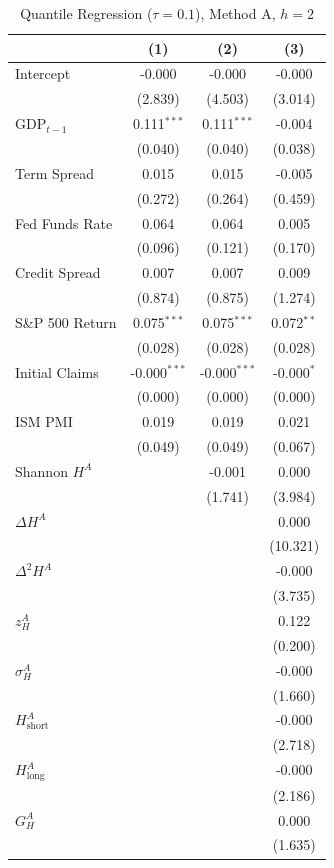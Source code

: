 \begin{table}[htbp]
\centering
\caption{Quantile Regression ($\tau = 0.1$), Method A, $h = 2$}
\label{tab:qr_coef_A_h2}
\footnotesize
\begin{tabular}{lccc}
\toprule
 & (1) & (2) & (3) \\
\midrule
  Intercept & -0.000 & -0.000 & -0.000 \\
  & (2.839) & (4.503) & (3.014) \\[2pt]
  GDP$_{t-1}$ & 0.111$^{***}$ & 0.111$^{***}$ & -0.004 \\
  & (0.040) & (0.040) & (0.038) \\[2pt]
  Term Spread & 0.015 & 0.015 & -0.005 \\
  & (0.272) & (0.264) & (0.459) \\[2pt]
  Fed Funds Rate & 0.064 & 0.064 & 0.005 \\
  & (0.096) & (0.121) & (0.170) \\[2pt]
  Credit Spread & 0.007 & 0.007 & 0.009 \\
  & (0.874) & (0.875) & (1.274) \\[2pt]
  S\&P 500 Return & 0.075$^{***}$ & 0.075$^{***}$ & 0.072$^{**}$ \\
  & (0.028) & (0.028) & (0.028) \\[2pt]
  Initial Claims & -0.000$^{***}$ & -0.000$^{***}$ & -0.000$^{*}$ \\
  & (0.000) & (0.000) & (0.000) \\[2pt]
  ISM PMI & 0.019 & 0.019 & 0.021 \\
  & (0.049) & (0.049) & (0.067) \\[2pt]
  Shannon $H^A$ &  & -0.001 & 0.000 \\
  &  & (1.741) & (3.984) \\[2pt]
  $\Delta H^A$ &  &  & 0.000 \\
  &  &  & (10.321) \\[2pt]
  $\Delta^2 H^A$ &  &  & -0.000 \\
  &  &  & (3.735) \\[2pt]
  $z^A_H$ &  &  & 0.122 \\
  &  &  & (0.200) \\[2pt]
  $\sigma^A_H$ &  &  & -0.000 \\
  &  &  & (1.660) \\[2pt]
  $H^A_{\mathrm{short}}$ &  &  & -0.000 \\
  &  &  & (2.718) \\[2pt]
  $H^A_{\mathrm{long}}$ &  &  & -0.000 \\
  &  &  & (2.186) \\[2pt]
  $G^A_H$ &  &  & 0.000 \\
  &  &  & (1.635) \\[2pt]
\bottomrule
\end{tabular}
\end{table}